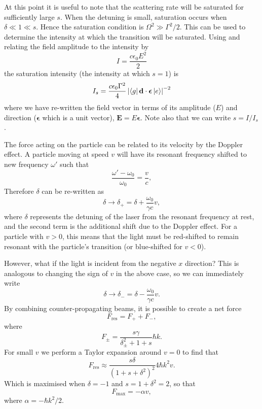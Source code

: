 At this point it is useful to note that the scattering rate will be saturated
for sufficiently large $s$. When the detuning is small, saturation occurs when
$\delta \ll 1 \ll s$. Hence the saturation condition is $\Omega^2 \gg
\Gamma^2 /2$. This can be used to determine the intensity at which the
transition will be saturated. Using  and relating the
field amplitude to the intensity by
%
\begin{equation}
  I=\frac{c\epsilon_0E^2}{2}
  \label{theory:eqn:IrelE}
\end{equation}
%
the saturation intensity (the intensity at which $s=1$) is
%
\begin{equation}
  I_s = \frac{c \epsilon_0 \Gamma^2}{4}\left|\bra{g}\mathbf{d}\cdot\bm{\epsilon}\ket{e}\right|^{-2}
\end{equation}
%
where we have re-written the field vector in terms of its amplitude ($E$) and
direction ($\bm{\epsilon}$ which is a unit vector), $\mathbf{E} =
E\bm{\epsilon}$. Note also that we can write $s=I/I_s$.

The force acting on the particle can be related to its velocity by the Doppler
effect. A particle moving at speed $v$ will have its resonant frequency shifted
to new frequency $\omega'$ such that
%
\begin{equation}
  \frac{\omega'-\omega_0}{\omega_0} = \frac{v}{c},
\end{equation}
%
Therefore $\delta$ can be re-written as
%
\begin{equation}
  \delta \rightarrow \delta_+ = \delta + \frac{\omega_0}{\gamma c}v,
\end{equation}
%
where $\delta$ represents the detuning of the laser from the resonant frequency
at rest, and the second term is the additional shift due to the Doppler effect.
For a particle with $v>0$, this means that the light must be red-shifted to
remain resonant with the particle's transition (or blue-shifted for $v<0$).

However, what if the light is incident from the negative $x$ direction? This is
analogous to changing the sign of $v$ in the above case, so we can immediately
write
%
\begin{equation}
  \delta \rightarrow \delta_- = \delta - \frac{\omega_0}{\gamma c}v.
\end{equation}
%
By combining counter-propagating beams, it is possible to create a net force
%
\begin{equation}
  F_\text{res} = F_+ + F_-,
\end{equation}
%
where
%
\begin{equation}
  F_\pm = \frac{s\gamma}{\delta_\pm^2 + 1 + s}\hbar k.
\end{equation}
%
For small $v$ we perform a Taylor expansion around $v=0$ to find that
%
\begin{equation}
  F_\text{res} \approx \frac{ s \delta}{(1 + s
  +\delta^2)^2}4\hbar k^2v.
\end{equation}
%
Which is maximised when $\delta = -1$ and $s = 1 + \delta^2 = 2$, so that
%
\begin{equation}
  F_\text{max} = - \alpha v,
\end{equation}
%
where $\alpha  = - \hbar k^2 /2$.

